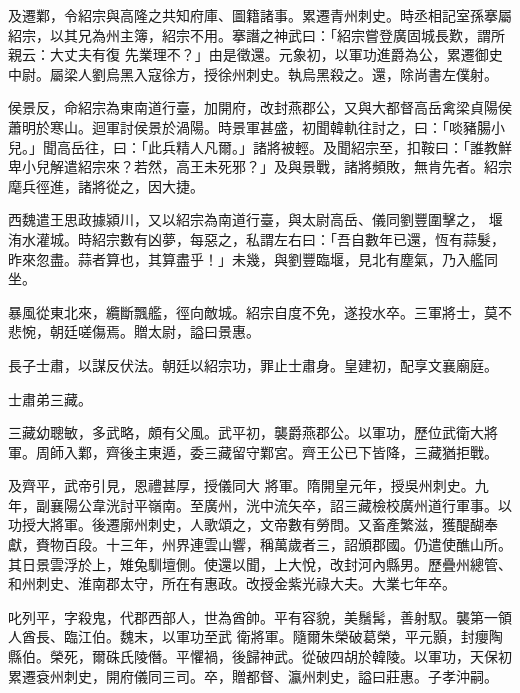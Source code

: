 \begin{pinyinscope}
 及遷鄴，令紹宗與高隆之共知府庫、圖籍諸事。累遷青州刺史。時丞相記室孫搴屬紹宗，以其兄為州主簿，紹宗不用。搴譖之神武曰：「紹宗嘗登廣固城長歎，謂所親云：大丈夫有復
 先業理不？」由是徵還。元象初，以軍功進爵為公，累遷御史中尉。屬梁人劉烏黑入寇徐方，授徐州刺史。執烏黑殺之。還，除尚書左僕射。



 侯景反，命紹宗為東南道行臺，加開府，改封燕郡公，又與大都督高岳禽梁貞陽侯蕭明於寒山。迴軍討侯景於渦陽。時景軍甚盛，初聞韓軌往討之，曰：「啖豬腸小兒。」聞高岳往，曰：「此兵精人凡爾。」諸將被輕。及聞紹宗至，扣鞍曰：「誰教鮮卑小兒解遣紹宗來？若然，高王未死邪？」及與景戰，諸將頻敗，無肯先者。紹宗麾兵徑進，諸將從之，因大捷。



 西魏遣王思政據潁川，又以紹宗為南道行臺，與太尉高岳、儀同劉豐圍擊之，
 堰洧水灌城。時紹宗數有凶夢，每惡之，私謂左右曰：「吾自數年已還，恆有蒜髮，昨來忽盡。蒜者算也，其算盡乎！」未幾，與劉豐臨堰，見北有塵氣，乃入艦同坐。



 暴風從東北來，纜斷飄艦，徑向敵城。紹宗自度不免，遂投水卒。三軍將士，莫不悲惋，朝廷嗟傷焉。贈太尉，謚曰景惠。



 長子士肅，以謀反伏法。朝廷以紹宗功，罪止士肅身。皇建初，配享文襄廟庭。



 士肅弟三藏。



 三藏幼聰敏，多武略，頗有父風。武平初，襲爵燕郡公。以軍功，歷位武衛大將軍。周師入鄴，齊後主東遁，委三藏留守鄴宮。齊王公已下皆降，三藏猶拒戰。



 及齊平，武帝引見，恩禮甚厚，授儀同大
 將軍。隋開皇元年，授吳州刺史。九年，副襄陽公韋洸討平嶺南。至廣州，洸中流矢卒，詔三藏檢校廣州道行軍事。以功授大將軍。後遷廓州刺史，人歌頌之，文帝數有勞問。又畜產繁滋，獲醍醐奉獻，賚物百段。十三年，州界連雲山響，稱萬歲者三，詔頒郡國。仍遣使醮山所。其日景雲浮於上，雉兔馴壇側。使還以聞，上大悅，改封河內縣男。歷疊州總管、和州刺史、淮南郡太守，所在有惠政。改授金紫光祿大夫。大業七年卒。



 叱列平，字殺鬼，代郡西部人，世為酋帥。平有容貌，美鬚髯，善射馭。襲第一領人酋長、臨江伯。魏末，以軍功至武
 衛將軍。隨爾朱榮破葛榮，平元顥，封癭陶縣伯。榮死，爾硃氏陵僭。平懼禍，後歸神武。從破四胡於韓陵。以軍功，天保初累遷袞州刺史，開府儀同三司。卒，贈都督、瀛州刺史，謚曰莊惠。子孝沖嗣。




\end{pinyinscope}
